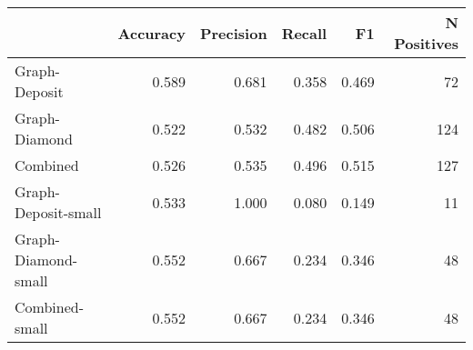 \begin{tabular}{lrrrrr}
\toprule
{} &  Accuracy &  Precision &  Recall &     F1 &  N Positives \\
\midrule
Graph-Deposit       &     0.589 &      0.681 &   0.358 &  0.469 &           72 \\
Graph-Diamond       &     0.522 &      0.532 &   0.482 &  0.506 &          124 \\
Combined            &     0.526 &      0.535 &   0.496 &  0.515 &          127 \\
Graph-Deposit-small &     0.533 &      1.000 &   0.080 &  0.149 &           11 \\
Graph-Diamond-small &     0.552 &      0.667 &   0.234 &  0.346 &           48 \\
Combined-small      &     0.552 &      0.667 &   0.234 &  0.346 &           48 \\
\bottomrule
\end{tabular}
